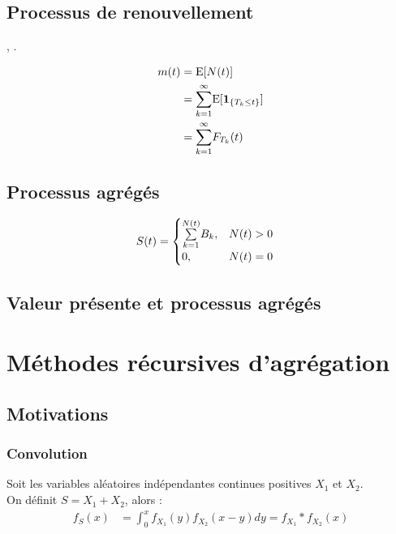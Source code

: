 \documentclass[10pt, french]{article}
\begin{document}
\begin{multicols*}{2}
\columnbreak
\subsection{Processus de renouvellement}
, .

\begin{align*}
	m(t)
	&=	\text{E}[N(t)]	\\
	&=	\overset{\infty}{\underset{k = 1}{\sum}}	\text{E}[\bm{1}_{\{T_{k} \leq t\}}]\\
	&=	\overset{\infty}{\underset{k = 1}{\sum}}	 F_{T_{k}}(t)\\
\end{align*}


\subsection{Processus agrégés}
\begin{align*}
	S(t)
	&=	\begin{cases}
		\overset{N(t)}{\underset{k = 1}{\sum}} B_{k},	&	N(t)	>	0	\\
		0,	&	N(t)	=	0
		\end{cases}
\end{align*}


\subsection{Valeur présente et processus agrégés}



\pagebreak
\section{Méthodes récursives d'agrégation}
\subsection{Motivations}
\subsubsection{Convolution}
\begin{rappel_enhanced}
Soit les variables aléatoires indépendantes continues positives $X_{1}$ et $X_{2}$.\\
On définit $S	=	X_{1} + X_{2}$, alors :
\begin{align*}
	f_{S}(x)
	&=	\int_{0}^{x} f_{X_{1}}(y) f_{X_{2}}(x - y) dy
	=	f_{X_{1}} \ast f_{X_{2}}(x)
\end{align*}


\end{rappel_enhanced}
\end{multicols*}
\end{document}
